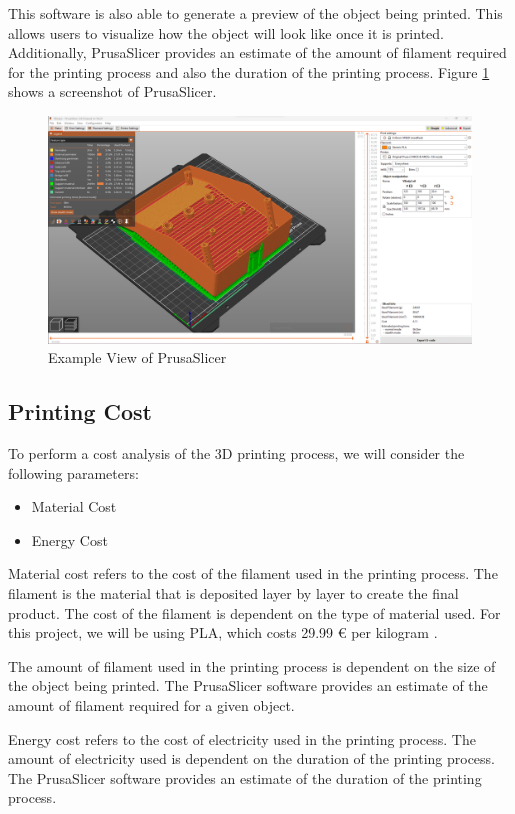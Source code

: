 This software is also able to generate a preview of the object being printed. This allows users to visualize how the object will look like once it is printed. Additionally, PrusaSlicer provides an estimate of the amount of filament required for the printing process and also the duration of the printing process. Figure \ref{fig:prusa_slicer} shows a screenshot of PrusaSlicer.

\begin{figure}
    \centering
    \includegraphics[width=0.8\linewidth]{texs/Part1/chapter1/image/prusaslicer.png}
    \caption{Example View of PrusaSlicer}
    \label{fig:prusa_slicer}
\end{figure}


\subsection{Printing Cost}
\label{subsec:printing_cost}

To perform a cost analysis of the 3D printing process, we will consider the following parameters:

\begin{itemize}
    \item Material Cost
    \item Energy Cost
\end{itemize}

Material cost refers to the cost of the filament used in the printing process. The filament is the material that is deposited layer by layer to create the final product. The cost of the filament is dependent on the type of material used. For this project, we will be using PLA, which costs 29.99 € per kilogram \cite{PrusaCost}.

The amount of filament used in the printing process is dependent on the size of the object being printed. The PrusaSlicer software provides an estimate of the amount of filament required for a given object.

Energy cost refers to the cost of electricity used in the printing process. The amount of electricity used is dependent on the duration of the printing process. The PrusaSlicer software provides an estimate of the duration of the printing process.

